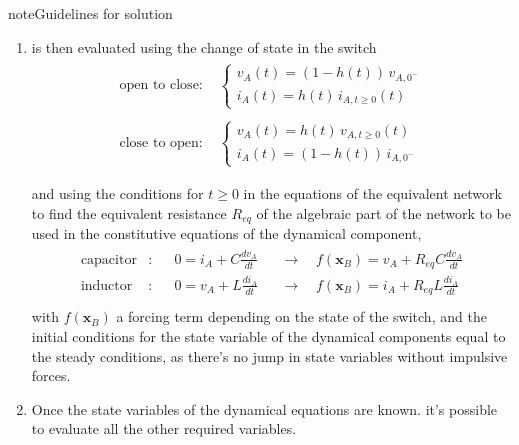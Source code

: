 \documentclass[letterpaper,10pt,english]{jupyterBook}
\begin{document}
\begin{sphinxadmonition}{note}{Guidelines for solution}
\begin{enumerate}
\sphinxAtStartPar
In the first two equations of the system, two of the four varaibles \(i_{A,B}\), \(v_{A,B}\) are thus known, and this system can be solved to find the other two quantities. Once \(\mathbf{i}_{port}\) is known, grid variables \(\mathbf{z}\) can be evaluated.

\item {} 
\sphinxAtStartPar
{} is then evaluated using the change of state in the switch
\begin{equation*}
\begin{split}\begin{aligned}
     \text{open to close: } & \begin{cases} v_{A}(t) = ( 1 - h(t) ) \, v_{A,0^-} \\
                                            i_{A}(t) =  h(t) \, i_{A,t\ge 0}(t) \end{cases} \\ \\
     \text{close to open: } & \begin{cases} v_{A}(t) = h(t) \, v_{A,t\ge 0}(t) \\
                                            i_{A}(t) = ( 1 - h(t) ) \, i_{A,0^-} \end{cases} \\ \\
   \end{aligned}\end{split}
\end{equation*}
\sphinxAtStartPar
and using the conditions for \(t \ge 0\) in the equations of the equivalent network to find the equivalent resistance \(R_{eq}\) of the algebraic part of the network to be used in the constitutive equations of the dynamical component,
\begin{equation*}
\begin{split}\begin{aligned}
     \text{capacitor} &: && 0 = i_A +  C \frac{d v_A}{d t} && \rightarrow \quad  f(\mathbf{x}_{B}) = v_A + R_{eq} C \frac{d v_A}{d t} \\
     \text{inductor } &: && 0 = v_A +  L \frac{d i_A}{d t} && \rightarrow \quad  f(\mathbf{x}_{B}) = i_A + R_{eq} L \frac{d i_A}{d t} \\
   \end{aligned}\end{split}
\end{equation*}
\sphinxAtStartPar
with \(f(\mathbf{x}_{B})\) a forcing term depending on the state of the switch, and the initial conditions for the state variable of the dynamical components equal to the steady conditions, as there’s no jump in state variables without impulsive forces.

\item {} 
\sphinxAtStartPar
Once the state variables of the dynamical equations are known. it’s possible to evaluate all the other required variables.

\end{enumerate}


\end{sphinxadmonition}
\end{document}
